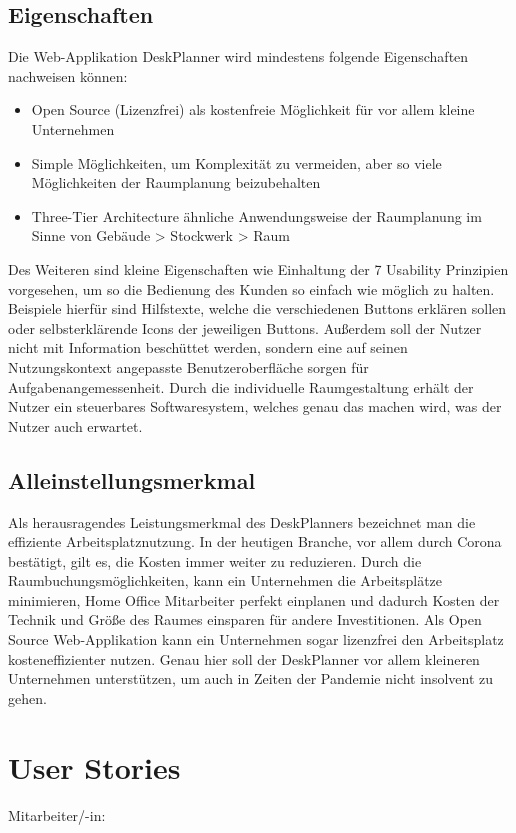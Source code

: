 \documentclass{article}
\begin{document}
\subsection{Eigenschaften}
Die Web-Applikation DeskPlanner wird mindestens folgende Eigenschaften nachweisen können:

\begin{itemize}
    \item Open Source (Lizenzfrei) als kostenfreie Möglichkeit für vor allem kleine Unternehmen
    \item Simple Möglichkeiten, um Komplexität zu vermeiden, aber so viele Möglichkeiten der Raumplanung beizubehalten
    \item Three-Tier Architecture ähnliche Anwendungsweise der Raumplanung im Sinne von Gebäude > Stockwerk > Raum 
\end{itemize}

Des Weiteren sind kleine Eigenschaften wie Einhaltung der 7 Usability Prinzipien vorgesehen, um so die Bedienung des Kunden so einfach wie möglich zu halten. 
Beispiele hierfür sind Hilfstexte, welche die verschiedenen Buttons erklären sollen oder selbsterklärende Icons der jeweiligen Buttons. 
Außerdem soll der Nutzer nicht mit Information beschüttet werden, sondern eine auf seinen Nutzungskontext angepasste Benutzeroberfläche sorgen für Aufgabenangemessenheit. 
Durch die individuelle Raumgestaltung erhält der Nutzer ein steuerbares Softwaresystem, welches genau das machen wird, was der Nutzer auch erwartet.

\subsection{Alleinstellungsmerkmal}
Als herausragendes Leistungsmerkmal des DeskPlanners bezeichnet man die effiziente Arbeitsplatznutzung. 
In der heutigen Branche, vor allem durch Corona bestätigt, gilt es, die Kosten immer weiter zu reduzieren. 
Durch die Raumbuchungsmöglichkeiten, kann ein Unternehmen die Arbeitsplätze minimieren, Home Office Mitarbeiter perfekt einplanen und dadurch Kosten der Technik und Größe des Raumes einsparen für andere Investitionen. 
Als Open Source Web-Applikation kann ein Unternehmen sogar lizenzfrei den Arbeitsplatz kosteneffizienter nutzen.
Genau hier soll der DeskPlanner vor allem kleineren Unternehmen unterstützen, um auch in Zeiten der Pandemie nicht insolvent zu gehen.

\section{User Stories}
Mitarbeiter/-in:
\end{document}
